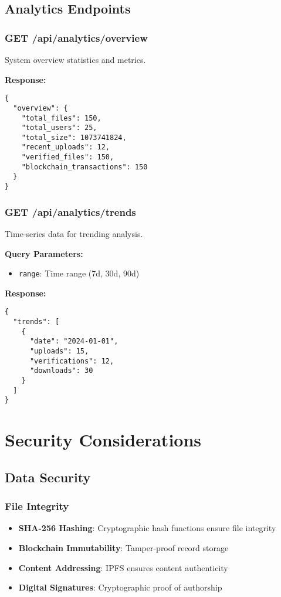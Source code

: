 \documentclass[11pt,a4paper]{article}
\begin{document}
\subsection{Analytics Endpoints}

\subsubsection{GET /api/analytics/overview}
System overview statistics and metrics.

\textbf{Response:}
\begin{lstlisting}[style=javascript]
{
  "overview": {
    "total_files": 150,
    "total_users": 25,
    "total_size": 1073741824,
    "recent_uploads": 12,
    "verified_files": 150,
    "blockchain_transactions": 150
  }
}
\end{lstlisting}

\subsubsection{GET /api/analytics/trends}
Time-series data for trending analysis.

\textbf{Query Parameters:}
\begin{itemize}
    \item \texttt{range}: Time range (7d, 30d, 90d)
\end{itemize}

\textbf{Response:}
\begin{lstlisting}[style=javascript]
{
  "trends": [
    {
      "date": "2024-01-01",
      "uploads": 15,
      "verifications": 12,
      "downloads": 30
    }
  ]
}
\end{lstlisting}

\section{Security Considerations}

\subsection{Data Security}

\subsubsection{File Integrity}
\begin{itemize}
    \item \textbf{SHA-256 Hashing}: Cryptographic hash functions ensure file integrity
    \item \textbf{Blockchain Immutability}: Tamper-proof record storage
    \item \textbf{Content Addressing}: IPFS ensures content authenticity
    \item \textbf{Digital Signatures}: Cryptographic proof of authorship
\end{itemize}
\end{document}

